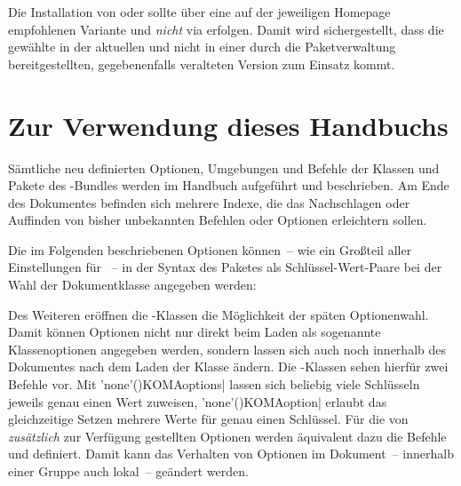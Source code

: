 
Die Installation von \href{https://tug.org/texlive/}{\TeXLive} oder 
\href{https://tug.org/mactex/}{\MacTeX} sollte über eine auf der jeweiligen 
Homepage empfohlenen Variante und \emph{nicht} via  
erfolgen. Damit wird sichergestellt, dass die gewählte \Distro in der aktuellen 
und nicht in einer durch die Paketverwaltung bereitgestellten, gegebenenfalls 
veralteten Version zum Einsatz kommt.



\section{Zur Verwendung dieses Handbuchs}

Sämtliche neu definierten Optionen, Umgebungen und Befehle der Klassen und 
Pakete des \TUDScript-Bundles werden im Handbuch aufgeführt und beschrieben. Am 
Ende des Dokumentes befinden sich mehrere Indexe, die das Nachschlagen oder 
Auffinden von bisher unbekannten Befehlen oder Optionen erleichtern sollen.

Die im Folgenden beschriebenen Optionen können~-- wie ein Großteil aller 
Einstellungen für \KOMAScript~-- in der Syntax des Paketes  
als Schlüssel-Wert-Paare bei der Wahl der Dokumentklasse angegeben werden:

Des Weiteren eröffnen die \KOMAScript-Klassen die Möglichkeit der späten 
Optionenwahl. Damit können Optionen nicht nur direkt beim Laden als sogenannte 
Klassenoptionen angegeben werden, sondern lassen sich auch noch innerhalb des 
Dokumentes nach dem Laden der Klasse ändern. Die \KOMAScript-Klassen sehen 
hierfür zwei Befehle vor. Mit 
\Macro'none'(){KOMAoptions|}
lassen sich beliebig viele Schlüsseln jeweils genau einen Wert zuweisen, 
\Macro'none'(){KOMAoption|}
erlaubt das gleichzeitige Setzen mehrere Werte für genau einen Schlüssel. 
Für die von \TUDScript \emph{zusätzlich} zur Verfügung gestellten Optionen
werden äquivalent dazu die Befehle 
und  definiert. 
Damit kann das Verhalten von Optionen im Dokument~-- innerhalb einer Gruppe 
auch lokal~-- geändert werden.

